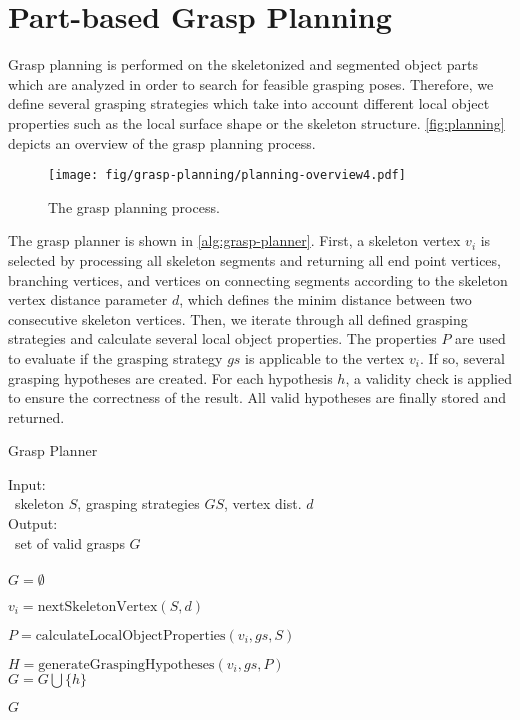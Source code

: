 \section{Part-based Grasp Planning}
\label{sec-planning}

Grasp planning is performed on the skeletonized and segmented object parts which are analyzed in order to search for feasible grasping poses. 
Therefore, we define several grasping strategies which take into account different local object properties such as the local surface shape or the skeleton structure.
\autoref{fig:planning} depicts an overview of the grasp planning process. 
\begin{figure}[tbh]%
\centering
\texttt{[image: fig/grasp-planning/planning-overview4.pdf]}
\caption{The grasp planning process.}%
\label{fig:planning}%
\end{figure}
The grasp planner is shown in \autoref{alg:grasp-planner}. First, a skeleton vertex $v_i$ is selected by processing all skeleton segments and returning all end point vertices, branching vertices, and vertices on connecting segments according to the skeleton vertex distance parameter $d$, which defines the minim distance between two consecutive skeleton vertices. 
Then, we  iterate through all defined grasping strategies and calculate several local object properties. The properties $P$ are used to evaluate if the grasping strategy $gs$ is applicable to the vertex $v_i$. If so, several grasping hypotheses are created. For each hypothesis $h$, a validity check is applied to ensure the correctness of the result. All valid hypotheses are finally stored and returned.

{\SetAlgoNoLine%
\begin{algorithm}[htb]
	\caption{Grasp Planner}
	\label{alg:grasp-planner}
	Input:\\
	\, skeleton $S$, grasping strategies $GS$, vertex dist. $d$\\
	Output:\\
	\, set of valid grasps $G$ \\
\hrulefill \\
	$G = \emptyset$\\
	{
		$v_i = \text{nextSkeletonVertex}(S, d)$\\
		{
			$P = \text{calculateLocalObjectProperties}(v_i, gs, S)$\\
			{
				$H = \text{generateGraspingHypotheses}(v_i, gs, P)$\\
				{
					{
						$G = G \bigcup \{h\}$
					}
				}
			
			}
		}
	}
	\Return $G$
\end{algorithm}
}


